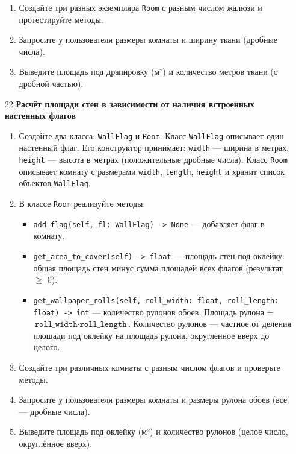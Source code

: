 \begin{enumerate}
\begin{enumerate}
    \item Создайте три разных экземпляра \texttt{Room} с разным числом жалюзи и протестируйте методы.

    \item Запросите у пользователя размеры комнаты и ширину ткани (дробные числа).

    \item Выведите площадь под драпировку (м²) и количество метров ткани (с дробной частью).
\end{enumerate}

\item[22] \textbf{Расчёт площади стен в зависимости от наличия встроенных настенных флагов}
\begin{enumerate}
    \item Создайте два класса: \texttt{WallFlag} и \texttt{Room}.  
    Класс \texttt{WallFlag} описывает один настенный флаг. Его конструктор принимает:  
    \texttt{width} — ширина в метрах,  
    \texttt{height} — высота в метрах (положительные дробные числа).  
    Класс \texttt{Room} описывает комнату с размерами \texttt{width}, \texttt{length}, \texttt{height} и хранит список объектов \texttt{WallFlag}.

    \item В классе \texttt{Room} реализуйте методы:  
    \begin{itemize}
        \item \texttt{add\_flag(self, fl: WallFlag) -> None} — добавляет флаг в комнату.
        \item \texttt{get\_area\_to\_cover(self) -> float} — площадь стен под оклейку: общая площадь стен минус сумма площадей всех флагов (результат $\geqslant$ 0).
        \item \texttt{get\_wallpaper\_rolls(self, roll\_width: float, roll\_length: float) -> int} — количество рулонов обоев. Площадь рулона = \(\texttt{roll\_width} \cdot \texttt{roll\_length}\). Количество рулонов — частное от деления площади под оклейку на площадь рулона, округлённое вверх до целого.
    \end{itemize}

    \item Создайте три различных комнаты с разным числом флагов и проверьте методы.

    \item Запросите у пользователя размеры комнаты и размеры рулона обоев (все — дробные числа).

    \item Выведите площадь под оклейку (м²) и количество рулонов (целое число, округлённое вверх).
\end{enumerate}


\end{enumerate}
